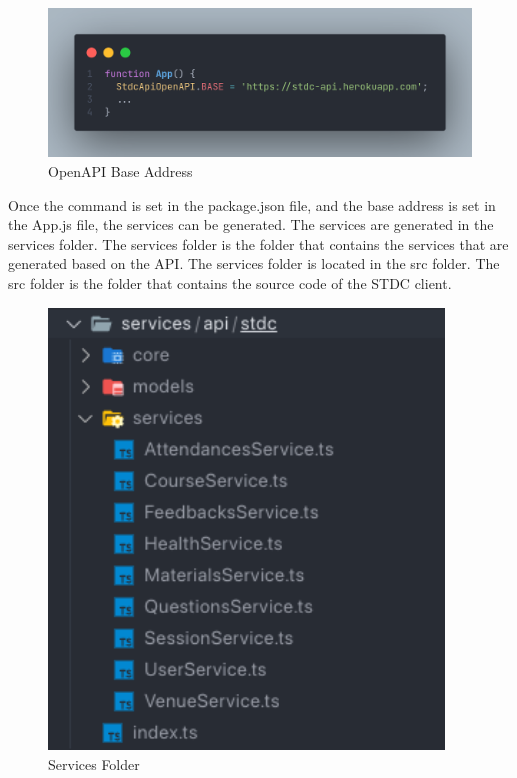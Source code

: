 \begin{justify}
        \begin{figure}[H]
            \centerline{\includegraphics[width=120mm,scale=1]{figures/implementation_and_testing/implementation/frontend/app-openapi.png}}
            \caption{OpenAPI Base Address}
        \end{figure}

        \vspace{-0.5cm}
        \newendline Once the command is set in the package.json file, and the base address is set in the App.js file, the services can be generated. The services are generated in the services folder. The services folder is the folder that contains the services that are generated based on the API. The services folder is located in the src folder. The src folder is the folder that contains the source code of the STDC client.

        \begin{figure}[H]
            \centerline{\includegraphics[width=105mm,scale=1]{figures/implementation_and_testing/implementation/frontend/services.png}}
            \caption{Services Folder}
        \end{figure}


\end{justify}
